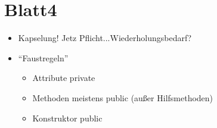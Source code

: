 \documentclass[18pt]{beamer}
\begin{document}
\section{Blatt4}
\begin{frame}\pause
\begin{itemize}
\item Kapselung! Jetz Pflicht...Wiederholungsbedarf?\pause
\item "`Faustregeln"'\pause
\begin{itemize}
	\item Attribute private
	\item Methoden meistens public (außer Hilfsmethoden)
	\item Konstruktor \color[rgb]{1,0,0}{IMMER} public
\end{itemize}
\end{itemize}
	
\end{frame}


\appendix
\beginbackup


\backupend
\end{document}
